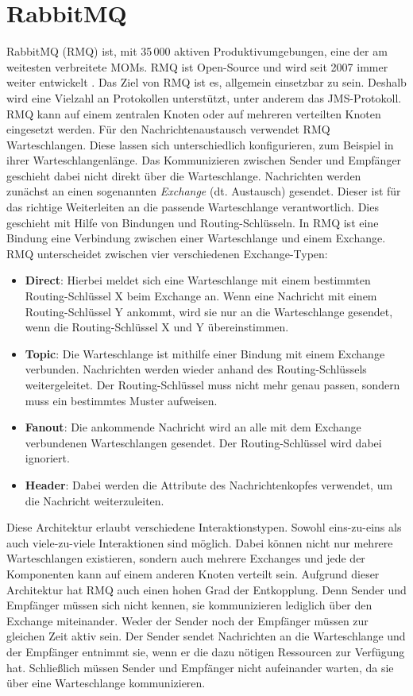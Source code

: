 \section{RabbitMQ}
\label{sec:rmq}
RabbitMQ (RMQ) ist, mit 35\,000 aktiven Produktivumgebungen, eine der am weitesten verbreitete MOMs. 
RMQ ist Open-Source und wird seit 2007 immer weiter entwickelt \cite{rabbitmq}. Das Ziel von RMQ ist es, allgemein einsetzbar zu sein. Deshalb wird eine Vielzahl an Protokollen unterstützt, unter anderem das JMS-Protokoll. RMQ kann auf einem zentralen Knoten oder auf mehreren verteilten Knoten eingesetzt werden. Für den Nachrichtenaustausch verwendet RMQ Warteschlangen. Diese lassen sich unterschiedlich konfigurieren, zum Beispiel in ihrer Warteschlangenlänge. Das Kommunizieren zwischen Sender und Empfänger geschieht dabei nicht direkt über die Warteschlange. Nachrichten werden zunächst an einen sogenannten \emph{Exchange} (dt. Austausch) gesendet. Dieser ist für das richtige Weiterleiten an die passende Warteschlange verantwortlich. Dies geschieht mit Hilfe von Bindungen und Routing-Schlüsseln. In RMQ ist eine Bindung eine Verbindung zwischen einer Warteschlange und einem Exchange. RMQ unterscheidet zwischen vier verschiedenen Exchange-Typen:
\begin{itemize}
    \item \textbf{Direct}: Hierbei meldet sich eine Warteschlange mit einem bestimmten Routing-Schlüssel X beim Exchange an. Wenn eine Nachricht mit einem Routing-Schlüssel Y ankommt, wird sie nur an die Warteschlange gesendet, wenn die Routing-Schlüssel X und Y übereinstimmen.
    \item \textbf{Topic}: Die Warteschlange ist mithilfe einer Bindung mit einem Exchange verbunden. Nachrichten werden wieder anhand des Routing-Schlüssels weitergeleitet. Der Routing-Schlüssel muss nicht mehr genau passen, sondern muss ein bestimmtes Muster aufweisen.
    \item \textbf{Fanout}: Die ankommende Nachricht wird an alle mit dem Exchange verbundenen Warteschlangen gesendet. Der Routing-Schlüssel wird dabei ignoriert.
    \item \textbf{Header}: Dabei werden die Attribute des Nachrichtenkopfes verwendet, um die Nachricht weiterzuleiten.
\end{itemize}
Diese Architektur erlaubt verschiedene Interaktionstypen. Sowohl eins-zu-eins als auch viele-zu-viele Interaktionen sind möglich. Dabei können nicht nur mehrere Warteschlangen existieren, sondern auch mehrere Exchanges und jede der Komponenten kann auf einem anderen Knoten verteilt sein. Aufgrund dieser Architektur hat RMQ auch einen hohen Grad der Entkopplung. Denn Sender und Empfänger müssen sich nicht kennen, sie kommunizieren lediglich über den Exchange miteinander. Weder der Sender noch der Empfänger müssen zur gleichen Zeit aktiv sein. Der Sender sendet Nachrichten an die Warteschlange und der Empfänger entnimmt sie, wenn er die dazu nötigen Ressourcen zur Verfügung hat. Schließlich müssen Sender und Empfänger nicht aufeinander warten, da sie über eine Warteschlange kommunizieren.
